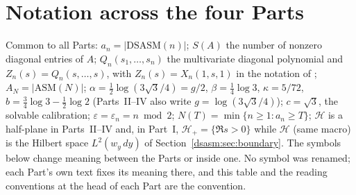 \documentclass[11pt,letterpaper]{article}
\theoremstyle{remark}\newtheorem{remark}[theorem]{Remark}
\newcommand{\eps}{\varepsilon}\newcommand{\HH}{\mathcal H}\newcommand{\one}{\mathbf1}
\newcommand{\DS}{\mathrm{DSASM}}\newcommand{\ASM}{\mathrm{ASM}}
\begin{document}
\section*{Notation across the four Parts}\label{dsasm:sec:notation}
Common to all Parts: $a_n=|\DS(n)|$; $S(A)$ the number of nonzero diagonal entries of $A$; $Q_n(s_1,\ldots,s_n)$ the multivariate diagonal polynomial and $Z_n(s)=Q_n(s,\ldots,s)$, with $Z_n(s)=X_n(1,s,1)$ in the notation of \cite{bfk}; $A_N=|\ASM(N)|$; $\alpha=\frac12\log(3\sqrt3/4)=g/2$, $\beta=\frac14\log3$, $\kappa=5/72$, $b=\frac34\log3-\frac12\log2$ (Parts~II--IV also write $g=\log(3\sqrt3/4)$); $c=\sqrt3$, the solvable calibration; $\eps=\eps_n=n\bmod2$; $N(T)=\min\{n\ge1:a_n\ge T\}$; $\HH$ is a half-plane in Parts~II--IV and, in Part~I, $\HH_+=\{\Re s>0\}$ while $\mathcal H$ (same macro) is the Hilbert space $L^2(w_y\,dy)$ of Section~\ref{dsasm:sec:boundary}. The symbols below change meaning between the Parts or inside one. No symbol was renamed; each Part's own text fixes its meaning there, and this table and the reading conventions at the head of each Part are the convention.
\end{document}
